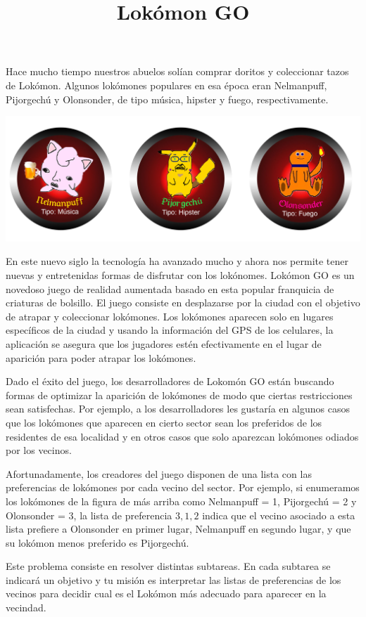 \documentclass{oci}
\title{Lokómon GO}
\begin{document}
\begin{problemDescription}
Hace mucho tiempo nuestros abuelos solían comprar doritos y coleccionar tazos
de Lokómon.
Algunos lokómones populares en esa época eran Nelmanpuff, Pijorgechú
y Olonsonder, de tipo música, hipster y fuego, respectivamente.

\begin{center}
	\includegraphics[scale=0.4]{lokomons.jpg}
\end{center}

En este nuevo siglo la tecnología ha avanzado mucho y ahora nos permite tener
nuevas y entretenidas formas de disfrutar con los lokónomes.
Lokómon GO es un novedoso juego de realidad aumentada basado en esta popular
franquicia de criaturas de bolsillo.
El juego consiste en desplazarse por la ciudad con el objetivo de atrapar y
coleccionar lokómones.
Los lokómones aparecen solo en lugares específicos de la ciudad y usando la
información del GPS de los celulares, la aplicación se asegura que los jugadores
estén efectivamente en el lugar de aparición para poder atrapar los lokómones.

Dado el éxito del juego, los desarrolladores de Lokomón GO están buscando formas
de optimizar la aparición de lokómones de modo que ciertas restricciones sean
satisfechas.
Por ejemplo, a los desarrolladores les gustaría en algunos casos que los
lokómones que aparecen en cierto sector sean los preferidos de los residentes de
esa localidad y en otros casos que solo aparezcan lokómones odiados por los
vecinos.

Afortunadamente, los creadores del juego disponen de una lista con las
preferencias de lokómones por cada vecino del sector.
Por ejemplo, si enumeramos los lokómones de la figura de más arriba como
Nelmanpuff = 1, Pijorgechú = 2 y Olonsonder = 3, la lista de preferencia $3, 1,
2$ indica que el vecino asociado a esta lista prefiere a Olonsonder en primer
lugar, Nelmanpuff en segundo lugar, y que su lokómon menos preferido es
Pijorgechú.

Este problema consiste en resolver distintas subtareas.
En cada subtarea se indicará un objetivo y tu misión es interpretar las
listas de preferencias de los vecinos para decidir cual es el Lokómon más
adecuado para aparecer en la vecindad.
\end{problemDescription}
\end{document}

